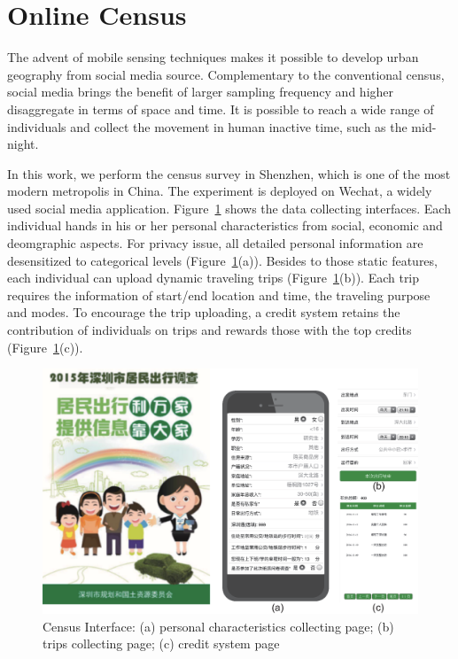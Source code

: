 \section{Online Census}

The advent of mobile sensing techniques makes it possible to develop urban geography from social media source. Complementary to the conventional census, social media brings the benefit of larger sampling frequency and higher disaggregate in terms of space and time. It is possible to reach a wide range of individuals and collect the movement in human inactive time, such as the mid-night.

In this work, we perform the census survey in Shenzhen, which is one of the most modern metropolis in China. The experiment is deployed on Wechat, a widely used social media application. Figure~\ref{fig:app} shows the data collecting interfaces. Each individual hands in his or her personal characteristics from social, economic and deomgraphic aspects. For privacy issue, all detailed personal information are desensitized to categorical levels (Figure~\ref{fig:app}(a)). Besides to those static features, each individual can upload dynamic traveling trips (Figure~\ref{fig:app}(b)). Each trip requires the information of start/end location and time, the traveling purpose and modes. To encourage the trip uploading, a credit system retains the contribution of individuals on trips and rewards those with the top credits (Figure~\ref{fig:app}(c)). 

\begin{figure}[htb!]
 \centering %
 \includegraphics[width=\columnwidth]{pictures/survey_app}
 \caption{Census Interface: (a) personal characteristics collecting page; (b) trips collecting page; (c) credit system page}
 \label{fig:app}
\end{figure}

